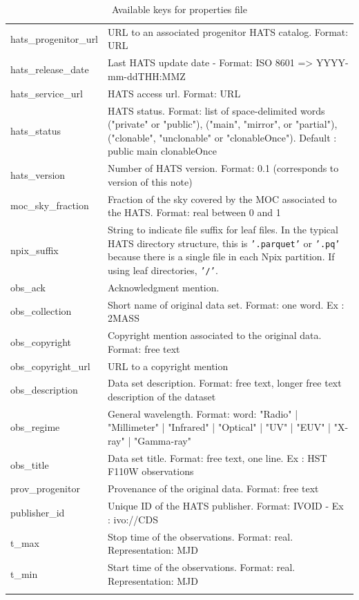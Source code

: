 \documentclass[11pt,a4paper]{ivoa}
\begin{document}
{\begin{longtable}[h!]{D{0.33\textwidth} D{0.67\textwidth}}
hats\_progenitor\_url &URL to an associated progenitor HATS catalog. Format: URL \\
hats\_release\_date &Last HATS update date - Format: ISO 8601 => YYYY-mm-ddTHH:MMZ \\
hats\_service\_url &HATS access url. Format: URL \\
hats\_status &HATS status. Format: list of space-delimited words ("private" or "public"), ("main", "mirror", or "partial"), ("clonable", "unclonable" or "clonableOnce"). Default : public main clonableOnce \\
hats\_version &Number of HATS version. Format: 0.1 (corresponds to version of this note) \\
moc\_sky\_fraction &Fraction of the sky covered by the MOC associated to the HATS. Format: real between 0 and 1 \\
npix\_suffix & String to indicate file suffix for leaf files. In the typical HATS directory structure, this is \texttt{'.parquet'} or \texttt{'.pq'} because there is a single file in each Npix partition. If using leaf directories, \texttt{'/'}. \\
obs\_ack &Acknowledgment mention. \\
obs\_collection &Short name of original data set. Format: one word. Ex : 2MASS \\
obs\_copyright &Copyright mention associated to the original data. Format: free text \\
obs\_copyright\_url &URL to a copyright mention \\
obs\_description &Data set description. Format: free text, longer free text description of the dataset \\
obs\_regime &General wavelength. Format: word: "Radio" | "Millimeter" | "Infrared" | "Optical" | "UV" | "EUV" | "X-ray" | "Gamma-ray" \\
obs\_title &Data set title. Format: free text, one line. Ex : HST F110W observations \\
prov\_progenitor &Provenance of the original data. Format: free text \\
publisher\_id &Unique ID of the HATS publisher. Format: IVOID - Ex : ivo://CDS \\
t\_max &Stop time of the observations. Format: real. Representation: MJD \\
t\_min &Start time of the observations. Format: real. Representation: MJD \\
\sptablerule    
\caption{Available keys for properties file}
\label{tab:properties}
\end{longtable}}
\end{document}
